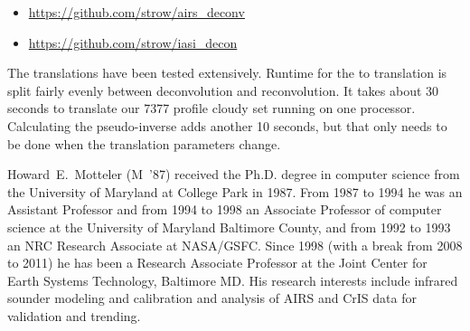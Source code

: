 \documentclass[journal]{IEEEtran}
\begin{document}
\begin{itemize}
   \item \url{https://github.com/strow/airs_deconv}
   \item \url{https://github.com/strow/iasi_decon}
\end{itemize}

The translations have been tested extensively.  Runtime for the
{\airs} to {\cris} translation is split fairly evenly between
deconvolution and reconvolution.  It takes about 30 seconds to
translate our 7377 profile cloudy set running on one processor.
Calculating the pseudo-inverse adds another 10 seconds, but that
only needs to be done when the translation parameters change.


% 
% 





\begin{IEEEbiography}{Howard~E.~Motteler}
  (M~'87) received the Ph.D. degree in computer science from the
  University of Maryland at College Park in 1987.  From 1987 to 1994
  he was an Assistant Professor and from 1994 to 1998 an Associate
  Professor of computer science at the University of Maryland
  Baltimore County, and from 1992 to 1993 an NRC Research Associate
  at NASA/GSFC.  Since 1998 (with a break from 2008 to 2011) he has
  been a Research Associate Professor at the Joint Center for Earth
  Systems Technology, Baltimore MD.  His research interests include
  infrared sounder modeling and calibration and analysis of AIRS and
  CrIS data for validation and trending.

\end{IEEEbiography}
\end{document}
